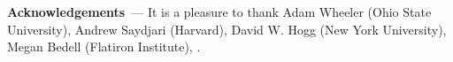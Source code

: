 \documentclass[modern]{aastex631}
\renewcommand{\paragraph}[1]{\medskip\par\noindent\textbf{#1}~---}
\begin{document}
\paragraph{Acknowledgements}
It is a pleasure to thank
    Adam Wheeler (Ohio State University),
    Andrew Saydjari (Harvard),
    David W. Hogg (New York University),
    Megan Bedell (Flatiron Institute),
.

%
\end{document}
